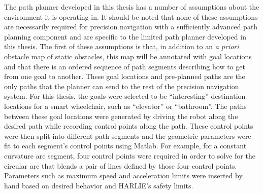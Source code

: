 The path planner developed in this thesis has a number of assumptions about the environment it is operating in. It should be noted that none of these assumptions are necessarily required for precision navigation with a sufficiently advanced path planning component and are specific to the limited path planner developed in this thesis. The first of these assumptions is that, in addition to an \emph{a priori} obstacle map of static obstacles, this map will be annotated with goal locations and that there is an ordered sequence of path segments describing how to get from one goal to another. These goal locations and pre-planned paths are the only paths that the planner can send to the rest of the precision navigation system. For this thesis, the goals were selected to be ``interesting'' destination locations for a smart wheelchair, such as ``elevator'' or ``bathroom''. The paths between these goal locations were generated by driving the robot along the desired path while recording control points along the path. These control points were then split into different path segments and the geometric parameters were fit to each segment's control points using Matlab. For example, for a constant curvature arc segment, four control points were required in order to solve for the circular arc that blends a pair of lines defined by those four control points. Parameters such as maximum speed and acceleration limits were inserted by hand based on desired behavior and HARLIE's safety limits.

